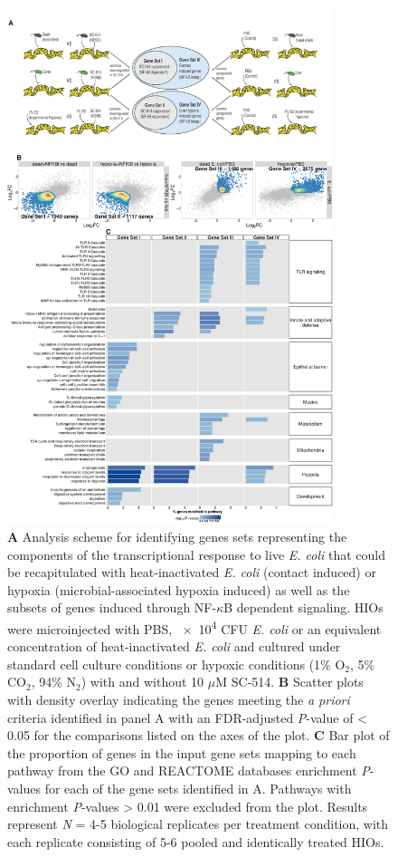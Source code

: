 \documentclass[9pt,lineo]{elife}
\begin{document}
\begin{figure}
\begin{fullwidth}
\centering
\includegraphics[width=0.85\textwidth]{./figures/figure5/figure5_multipanel.pdf}
\caption{\textbf{A} Analysis scheme for identifying genes sets representing the components of the transcriptional response to live \textit{E. coli} that could be recapitulated with heat-inactivated \textit{E. coli} (contact induced) or hypoxia (microbial-associated hypoxia induced) as well as the subsets of genes induced through NF-$\kappa$B dependent signaling. HIOs were microinjected with PBS, \num{e4} CFU \textit{E. coli} or an equivalent concentration of heat-inactivated \textit{E. coli} and cultured under standard cell culture conditions or hypoxic conditions (1\% O$_{2}$, 5\% CO$_{2}$, 94\% N$_{2}$) with and without 10 $\mu$M SC-514. \textbf{B} Scatter plots with density overlay indicating the genes meeting the \textit{a priori} criteria identified in panel A with an FDR-adjusted \textit{P}-value of < 0.05 for the comparisons listed on the axes of the plot. \textbf{C} Bar plot of the proportion of genes in the input gene sets mapping to each pathway from the GO and REACTOME databases enrichment \textit{P}-values for each of the gene sets identified in A. Pathways with enrichment \textit{P}-values > 0.01 were excluded from the plot. Results represent \textit{N} = 4-5 biological replicates per treatment condition, with each replicate consisting of 5-6 pooled and identically treated HIOs. }
\label{fig:fullwidth}
\end{fullwidth}
\end{figure}
\end{document}
